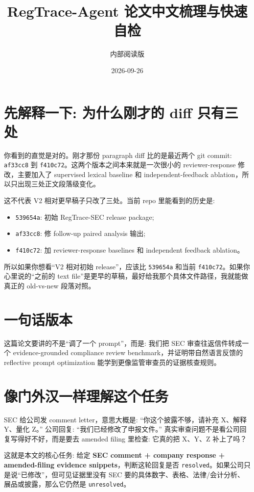\documentclass[11pt,fontset=none]{ctexart}
\title{\textbf{RegTrace-Agent 论文中文梳理与快速自检}}
\author{内部阅读版}
\date{2026-09-26}
\newcommand{\good}[1]{\textcolor{blue!70!black}{#1}}
\begin{document}
\maketitle

\section*{先解释一下: 为什么刚才的 diff 只有三处}

你看到的直觉是对的。刚才那份 paragraph diff 比的是最近两个 git commit:
\texttt{af33cc8} 到 \texttt{f410c72}。这两个版本之间本来就是一次很小的 reviewer-response 修改，主要加入了 supervised lexical baseline 和 independent-feedback ablation，所以只出现三处正文段落级变化。

这不代表 V2 相对更早稿子只改了三处。当前 repo 里能看到的历史是:
\begin{itemize}
    \item \texttt{539654a}: 初始 RegTrace-SEC release package;
    \item \texttt{af33cc8}: 修 follow-up paired analysis 输出;
    \item \texttt{f410c72}: 加 reviewer-response baselines 和 independent feedback ablation。
\end{itemize}
所以如果你想看``V2 相对初始 release''，应该比 \texttt{539654a} 和当前 \texttt{f410c72}。如果你心里说的``之前的 text file''是更早的草稿，最好给我那个具体文件路径，我就能做真正的 old-vs-new 段落对照。

\section*{一句话版本}

这篇论文要讲的不是``调了一个 prompt''，而是: \good{我们把 SEC 审查往返信件转成一个 evidence-grounded compliance review benchmark，并证明带自然语言反馈的 reflective prompt optimization 能学到更像监管审查员的证据核查规则。}

\section*{像门外汉一样理解这个任务}

SEC 给公司发 comment letter，意思大概是: ``你这个披露不够，请补充 X、解释 Y、量化 Z。'' 公司回复: ``我们已经修改了申报文件。'' 真实审查问题不是看公司回复写得好不好，而是要去 amended filing 里检查: 它真的把 X、Y、Z 补上了吗？

这就是本文的核心任务: 给定 \textbf{SEC comment + company response + amended-filing evidence snippets}，判断这轮回复是否 \texttt{resolved}。如果公司只是说``已修改''，但可见证据里没有 SEC 要的具体数字、表格、法律/会计分析、展品或披露，那么它仍然是 \texttt{unresolved}。
\end{document}
